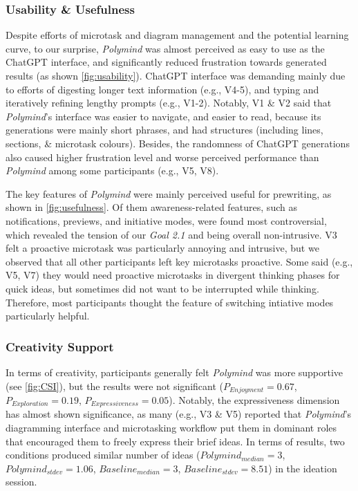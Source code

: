 \subsubsection{Usability \& Usefulness}
Despite efforts of microtask and diagram management and the potential learning curve, to our surprise, \textit{Polymind} was almost perceived as easy to use as the ChatGPT interface, and significantly reduced frustration towards generated results (as shown \autoref{fig:usability}). ChatGPT interface was demanding mainly due to efforts of digesting longer text information (e.g., V4-5), and typing and iteratively refining lengthy prompts (e.g., V1-2). 
Notably, V1 \& V2 said that \textit{Polymind}'s interface was easier to navigate, and easier to read, because its generations were mainly short phrases, and had structures (including lines, sections, \& microtask colours). 
Besides, the randomness of ChatGPT generations also caused higher frustration level and worse perceived performance than \textit{Polymind} among some participants (e.g., V5, V8).

The key features of \textit{Polymind} were mainly perceived useful for prewriting, as shown in \autoref{fig:usefulness}. Of them awareness-related features, such as notifications, previews, and initiative modes, were found most controversial, which revealed the tension of our \textit{Goal 2.1} and being overall non-intrusive. V3 felt a proactive microtask was particularly annoying and intrusive, but we observed that all other participants left key microtasks proactive. Some said (e.g., V5, V7) they would need proactive microtasks in divergent thinking phases for quick ideas, but sometimes did not want to be interrupted while thinking. Therefore, most participants thought the feature of switching intiative modes particularly helpful.

% 


\subsubsection{Creativity Support}
In terms of creativity, participants generally felt \textit{Polymind} was more supportive (see \autoref{fig:CSI}), but the results were not significant ($P_{Enjoyment}=0.67$, $P_{Exploration}=0.19$, $P_{Expressiveness}=0.05$). Notably, the expressiveness dimension has almost shown significance, as many (e.g., V3 \& V5) reported that \textit{Polymind}'s diagramming interface and microtasking workflow put them in dominant roles that encouraged them to freely express their brief ideas. In terms of results, two conditions produced similar number of ideas ($Polymind_{median}=3$, $Polymind_{stdev}=1.06$, $Baseline_{median}=3$, $Baseline_{stdev}=8.51$) in the ideation session.

